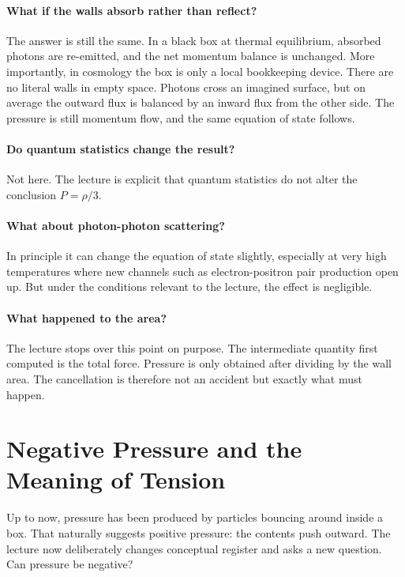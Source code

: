 \paragraph{What if the walls absorb rather than reflect?} The answer is still the same. In a black box at thermal equilibrium, absorbed photons are re-emitted, and the net momentum balance is unchanged. More importantly, in cosmology the box is only a local bookkeeping device. There are no literal walls in empty space. Photons cross an imagined surface, but on average the outward flux is balanced by an inward flux from the other side. The pressure is still momentum flow, and the same equation of state follows.

\paragraph{Do quantum statistics change the result?} Not here. The lecture is explicit that quantum statistics do not alter the conclusion \(P=\rho/3\).

\paragraph{What about photon-photon scattering?} In principle it can change the equation of state slightly, especially at very high temperatures where new channels such as electron-positron pair production open up. But under the conditions relevant to the lecture, the effect is negligible.

\paragraph{What happened to the area?} The lecture stops over this point on purpose. The intermediate quantity first computed is the total force. Pressure is only obtained after dividing by the wall area. The cancellation is therefore not an accident but exactly what must happen.

\section{Negative Pressure and the Meaning of Tension}

Up to now, pressure has been produced by particles bouncing around inside a box. That naturally suggests positive pressure: the contents push outward. The lecture now deliberately changes conceptual register and asks a new question. Can pressure be negative?

